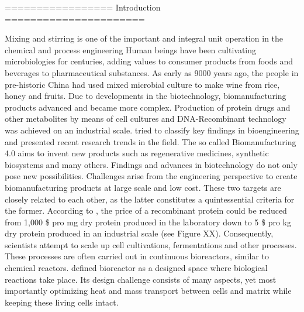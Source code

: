 ================= Introduction ======================

Mixing and stirring is one of the important and integral unit operation in the chemical and process engineering
Human beings have been cultivating microbiologies for centuries, adding values to consumer products from foods and beverages to pharmaceutical substances. As early as 9000 years ago, the people in pre-historic China had used mixed microbial culture to make wine from rice, honey and fruits. Due to developments in the biotechnology, biomanufacturing products advanced and became more complex. Production of protein drugs and other metabolites by means of cell cultures and DNA-Recombinant technology was achieved on an industrial scale. \cite{Zhang2017} tried to classify key findings in bioengineering and presented recent research trends in the field. The so called Biomanufacturing 4.0 aims to invent new products such as regenerative medicines, synthetic biosystems and many others.
Findings and advances in biotechnology do not only pose new possibilities. Challenges arise from the engineering perspective to create biomanufacturing products at large scale and low cost. These two targets are closely related to each other, as the latter constitutes a quintessential criteria for the former. According to \cite{Zhang2017}, the price of a recombinant protein could be reduced from 1,000 \$ pro mg dry protein produced in the laboratory down to 5 \$ pro kg dry protein produced in an industrial scale (see Figure XX).  
Consequently, scientists attempt to scale up cell cultivations, fermentations and other processes. These processes are often carried out in continuous bioreactors, similar to chemical reactors. \cite{Mandenius2016} defined bioreactor as a designed space where biological reactions take place. Its design challenge consists of many aspects, yet most importantly optimizing heat and mass transport between cells and matrix while keeping these living cells intact.